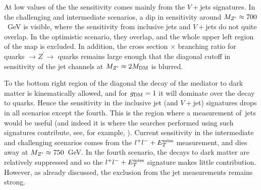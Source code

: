 \documentclass[floatfix]{article}
\begin{document}
At low values of the \MZP the sensitivity comes mainly from the $V+$jets signatures. In the challenging and intermediate scenarios, a dip in sensitivity around 
$M_{Z^{\prime}} \approx 700$~GeV is visible, where the sensitivity from inclusive jets and $V+$jets do not quite overlap. In the optimistic scenario, they overlap, and the whole upper
left region of the map is excluded. In addition, the cross section $\times$ branching ratio for quarks $\rightarrow Z^\prime \rightarrow$ quarks remains large
enough that the diagonal cutoff in sensitivity of the jet channels at $M_{Z^{\prime}} \approx 2M_{\rm DM}$ is blurred. 

To the bottom right region of the diagonal the decay of the mediator to dark matter is kinematically allowed, and for $g_{\rm DM}=1$ it will dominate 
over the decay to quarks. Hence the sensitivity in the inclusive jet (and $V+$jet) signatures drops in all scenarios except the fourth. 
This is the region where a measurement of \MET{+}\,jets would be useful 
(and indeed it is where the searches performed using such signatures contribute, see, for example, \cite{Kahlhoefer:2015bea,Heisig:2015ira}). Current sensitivity in the intermediate and challenging scenarios 
comes from the $l^+l^- + E_T^{\rm miss}$ measurement, and dies away at $M_{Z^{\prime}} \approx 750$~GeV. In the fourth scenario, the decays to dark matter are relatively suppressed and 
so the $l^+l^- + E_T^{\rm miss}$ signature makes little contribution. However, as already discussed, the exclusion from the jet measurements remains strong.
\end{document}
